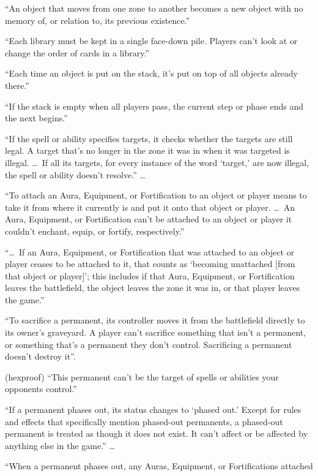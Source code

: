 \documentclass[11pt]{article}
\theoremstyle{definition}
\begin{document}
\begin{description}[leftmargin=1em,itemsep=1pt,parsep=0pt]
\item[400.7] ``An object that moves from one zone to another becomes a new object with no
  memory of, or relation to, its previous existence.''
\item[401.2] ``Each library must be kept in a single face-down pile. Players can't look at or
  change the order of cards in a library.''
\item[405.2] ``Each time an object is put on the stack, it's put on top of all objects
  already there.''
\item[405.5] ``If the stack is empty when all players pass, the current step or phase ends
  and the next begins.''
\item[608.2b] ``If the spell or ability specifies targets, it checks whether the targets are
  still legal. A target that's no longer in the zone it was in when it was targeted is
  illegal. \dots\ If all its targets, for every instance of the word `target,' are now
  illegal, the spell or ability doesn't resolve.'' \dots
\item[701.3a] ``To attach an Aura, Equipment, or Fortification to an object or player means
  to take it from where it currently is and put it onto that object or player. \dots\ An
  Aura, Equipment, or Fortification can't be attached to an object or player it couldn't
  enchant, equip, or fortify, respectively.''
\item[701.3d] ``\dots\ If an Aura, Equipment, or Fortification that was attached to an
  object or player ceases to be attached to it, that counts as `becoming unattached [from
  that object or player]'; this includes if that Aura, Equipment, or Fortification leaves
  the battlefield, the object leaves the zone it was in, or that player leaves the game.''
\item[701.21a] ``To sacrifice a permanent, its controller moves it from the battlefield
  directly to its owner's graveyard. A player can't sacrifice something that isn't a
  permanent, or something that's a permanent they don't control. Sacrificing a permanent
  doesn't destroy it''.
\item[702.11b] (hexproof) ``This permanent can't be the target of spells or abilities your
  opponents control.''
\item[702.26b] ``If a permanent phases out, its status changes to `phased out.' Except for
  rules and effects that specifically mention phased-out permanents, a phased-out permanent
  is treated as though it does not exist. It can't affect or be affected by anything else
  in the game.'' \dots
\item[702.26g] ``When a permanent phases out, any Auras, Equipment, or Fortifications attached

\end{description}
\end{document}

